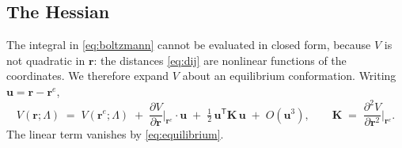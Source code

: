 \documentclass[11pt]{article}
\newcommand{\rr}{\mathbf{r}}
\newcommand{\KK}{\mathbf{K}}
\newcommand{\LL}{\Lambda}
\newcommand{\re}{\rr^{e}}
\begin{document}
\subsection{The Hessian}

The integral in \eqref{eq:boltzmann} cannot be evaluated in closed form, because
$V$ is not quadratic in $\rr$: the distances \eqref{eq:dij} are nonlinear
functions of the coordinates. We therefore expand $V$ about an equilibrium
conformation. Writing $\mathbf{u} = \rr - \re$,
\begin{equation}
V(\rr;\LL) \;=\; V(\re;\LL)
\;+\; \frac{\partial V}{\partial \rr}\bigg|_{\re}\!\!\cdot \mathbf{u}
\;+\; \tfrac12\, \mathbf{u}^{\mathsf T} \KK\, \mathbf{u} \;+\; O(\mathbf{u}^3),
\qquad
\KK \;=\; \frac{\partial^2 V}{\partial \rr^2}\bigg|_{\re}.
\label{eq:expansion}
\end{equation}
The linear term vanishes by \eqref{eq:equilibrium}.
\end{document}
